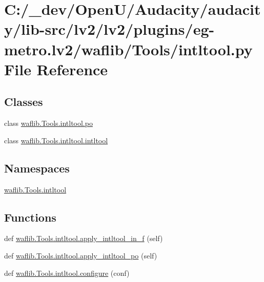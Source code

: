 \hypertarget{lv2_2plugins_2eg-metro_8lv2_2waflib_2_tools_2intltool_8py}{}\section{C\+:/\+\_\+dev/\+Open\+U/\+Audacity/audacity/lib-\/src/lv2/lv2/plugins/eg-\/metro.lv2/waflib/\+Tools/intltool.py File Reference}
\label{lv2_2plugins_2eg-metro_8lv2_2waflib_2_tools_2intltool_8py}
\subsection*{Classes}
\begin{DoxyCompactItemize}
\item 
class \hyperlink{classwaflib_1_1_tools_1_1intltool_1_1po}{waflib.\+Tools.\+intltool.\+po}
\item 
class \hyperlink{classwaflib_1_1_tools_1_1intltool_1_1intltool}{waflib.\+Tools.\+intltool.\+intltool}
\end{DoxyCompactItemize}
\subsection*{Namespaces}
\begin{DoxyCompactItemize}
\item 
 \hyperlink{namespacewaflib_1_1_tools_1_1intltool}{waflib.\+Tools.\+intltool}
\end{DoxyCompactItemize}
\subsection*{Functions}
\begin{DoxyCompactItemize}
\item 
def \hyperlink{namespacewaflib_1_1_tools_1_1intltool_aa64909ee30db7f6c262eb9c6bacc5f08}{waflib.\+Tools.\+intltool.\+apply\+\_\+intltool\+\_\+in\+\_\+f} (self)
\item 
def \hyperlink{namespacewaflib_1_1_tools_1_1intltool_a8e47eb8e5671c4d3f18cdb788a5868b6}{waflib.\+Tools.\+intltool.\+apply\+\_\+intltool\+\_\+po} (self)
\item 
def \hyperlink{namespacewaflib_1_1_tools_1_1intltool_a6e857d8fd69986194be76352936c4db1}{waflib.\+Tools.\+intltool.\+configure} (conf)
\end{DoxyCompactItemize}
